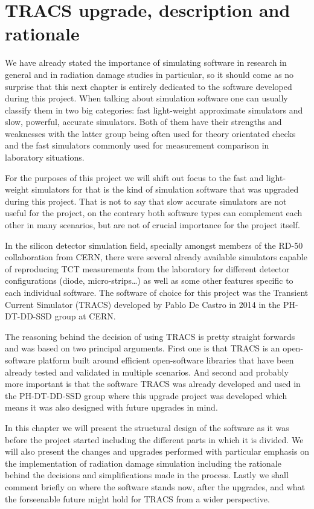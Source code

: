\chapter{TRACS upgrade, description and rationale}
\label{chap:tracs}

We have already stated the importance of simulating software in research in general and in radiation damage studies in particular, so it should come as no surprise that this next chapter is entirely dedicated to the software developed during this project. When talking about simulation software one can usually classify them in two big categories: fast light-weight approximate simulators and slow, powerful, accurate simulators. Both of them have their strengths and weaknesses with the latter group being often used for theory orientated checks and the fast simulators commonly used for measurement comparison in laboratory situations.

For the purposes of this project we will shift out focus to the fast and light-weight simulators for that is the kind of simulation software that was upgraded during this project. That is not to say that slow accurate simulators are not useful for the project, on the contrary both software types can complement each other in many scenarios, but are not of crucial importance for the project itself.

In the silicon detector simulation field, specially amongst members of the RD-50 collaboration from CERN, there were several already available simulators capable of reproducing TCT measurements from the laboratory for different detector configurations (diode, micro-strips\ldots) as well as some other features specific to each individual software. The software of choice for this project was the Transient Current Simulator (TRACS) developed by Pablo De Castro in 2014 in the PH-DT-DD-SSD group at CERN. 

The reasoning behind the decision of using TRACS is pretty straight forwards and was based on two principal arguments. First one is that TRACS is an open-software platform built around efficient open-software libraries that have been already tested and validated in multiple scenarios. And second and probably more important is that the software TRACS was already developed and used in the PH-DT-DD-SSD group where this upgrade project was developed which means it was also designed with future upgrades in mind. 

In this chapter we will present the structural design of the software as it was before the project started including the different parts in which it is divided. We will also present the changes and upgrades performed with particular emphasis on the implementation of radiation damage simulation including the rationale behind the decisions and simplifications made in the process. Lastly we shall comment briefly on where the software stands now, after the upgrades, and what the forseenable future might hold for TRACS from a wider perspective.

